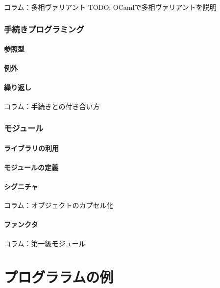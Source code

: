 \documentclass[11pt,a4paper]{article}
\begin{document}
\begin{itembox}[l]{コラム：多相ヴァリアント}
  TODO:
OCamlで多相ヴァリアントを説明
\end{itembox}

\section{手続きプログラミング}
\subsection{参照型}
\subsection{例外}
\subsection{繰り返し}

\begin{itembox}[l]{コラム：手続きとの付き合い方}

\end{itembox}

\section{モジュール}
\subsection{ライブラリの利用}
\subsection{モジュールの定義}
\subsection{シグニチャ}
\begin{itembox}[l]{コラム：オブジェクトのカプセル化}
\end{itembox}
\subsection{ファンクタ}

\begin{itembox}[l]{コラム：第一級モジュール}
\end{itembox}

\part{プログララムの例}
\end{document}
